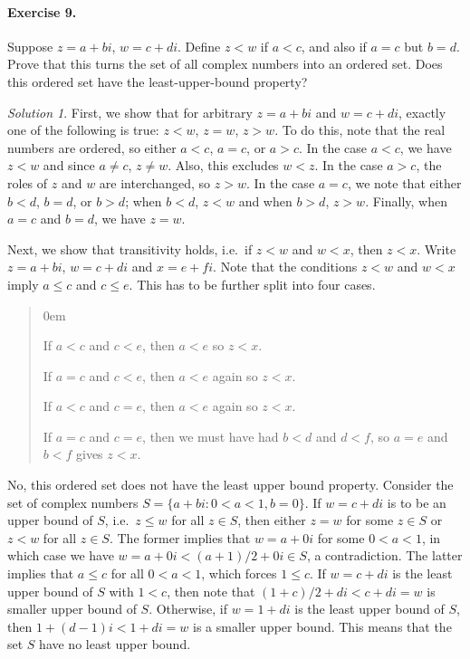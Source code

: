 \documentclass[11pt]{report}
\theoremstyle{remark}
\newtheorem*{solution}{Solution}
\begin{document}
    \paragraph{Exercise 9.} Suppose $z = a + bi$, $w = c + di$. Define $z < w$ if $a
    < c$, and also if $a = c$ but $b = d$. Prove that this turns the set of all
    complex numbers into an ordered set. Does this ordered set have the
    least-upper-bound property?
    \begin{solution}
        First, we show that for arbitrary $z = a + bi$ and $w = c + di$, exactly one
        of the following is true: $z < w$, $z = w$, $z > w$. To do this, note that
        the real numbers are ordered, so either $a < c$, $a = c$, or $a > c$.
        In the case $a < c$, we have $z < w$ and since $a \neq c$, $z \neq w$. Also,
        this excludes $w < z$. In the case $a > c$, the roles of $z$ and $w$ are
        interchanged, so $z > w$. In the case $a = c$, we note that either $b < d$,
        $b = d$, or $b > d$; when $b < d$, $z < w$ and when $b > d$, $z > w$.
        Finally, when $a = c$ and $b = d$, we have $z = w$.

        Next, we show that transitivity holds, i.e.\ if $z < w$ and $w < x$, then $z
        < x$. Write $z = a + bi$, $w = c + di$ and $x = e + fi$. Note that the
        conditions $z < w$ and $w < x$ imply $a \leq c$ and $c \leq e$. This has to
        be further split into four cases.
        \begin{quote}
        \begin{description}
            \itemsep0em
            \item[Case 1] If $a < c$ and $c < e$, then $a < e$ so $z < x$.
            \item[Case 2] If $a = c$ and $c < e$, then $a < e$ again so $z < x$.
            \item[Case 3] If $a < c$ and $c = e$, then $a < e$ again so $z < x$.
            \item[Case 4] If $a = c$ and $c = e$, then we must have had $b < d$
            and $d < f$, so $a = e$ and $b < f$ gives $z < x$.
        \end{description}
        \end{quote}

        No, this ordered set does not have the least upper bound property. Consider
        the set of complex numbers $S = \{a + bi: 0 < a < 1, b = 0\}$. If $w = c +
        di$ is to be an upper bound of $S$, i.e.\ $z \leq w$ for all $z \in S$, then 
        either $z = w$ for some $z \in S$ or $z < w$ for all $z \in S$.
        The former implies that $w = a + 0i$ for some $0 < a < 1$, in which case we
        have $w = a + 0i < (a + 1) / 2 + 0i \in S$, a contradiction. The latter
        implies that $a \leq c$ for all $0 < a < 1$, which forces $1 \leq c$.
        If $w = c + di$ is the least upper bound of $S$ with $1 < c$, then note that
        $(1 + c) / 2 + di < c + di = w$ is smaller upper bound of $S$. Otherwise, if
        $w = 1 + di$ is the least upper bound of $S$, then $1 + (d - 1)i < 1 + di =
        w$ is a smaller upper bound. This means that the set $S$ have no least upper
        bound.
    \end{solution}
    
\end{document}
